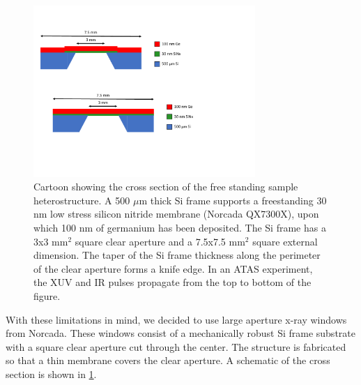 \begin{figure}
	\centering
	\includegraphics[width=0.75\textwidth]{figures/chap4/Sample_Geometry.pdf}
	\caption{Cartoon showing the cross section of the free standing sample heterostructure. A 500 $\mu$m thick Si frame supports a freestanding 30 nm low stress silicon nitride membrane (Norcada QX7300X), upon which 100 nm of germanium has been deposited. The Si frame has a 3x3 mm$^2$ square clear aperture and a 7.5x7.5 mm$^2$ square external dimension. The taper of the Si frame thickness along the perimeter of the clear aperture forms a knife edge. In an ATAS experiment, the XUV and IR pulses propagate from the top to bottom of the figure.}
	\label{fig:Sample_Geometry}
\end{figure}

With these limitations in mind, we decided to use large aperture x-ray windows from Norcada. These windows consist of a mechanically robust Si frame substrate with a square clear aperture cut through the center. The structure is fabricated so that a thin membrane covers the clear aperture. A schematic of the cross section is shown in \cref{fig:Sample_Geometry}.

